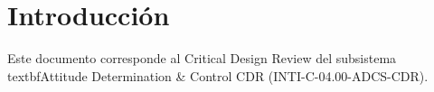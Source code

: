 \section{Introducción}
Este documento corresponde al Critical Design Review del subsistema \\textbf{Attitude Determination & Control CDR} (INTI-C-04.00-ADCS-CDR).
